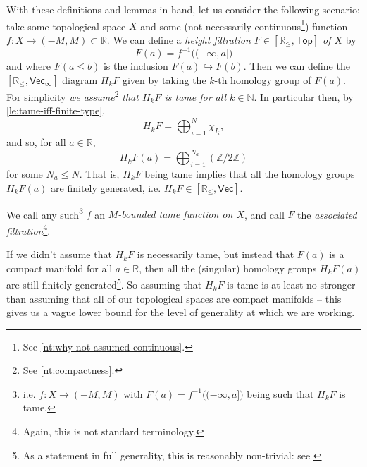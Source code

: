 \documentclass[12pt]{article}
\numberwithin{equation}{subsection}
\numberwithin{theorem}{subsection}
\numberwithin{lemma}{subsection}
\numberwithin{corollary}{subsection}
\numberwithin{definition}{subsection}
\numberwithin{example}{subsection}
\numberwithin{note}{subsection}
\newcommand{\zz}{\mathbb{Z}}
\newcommand{\rr}{\mathbb{R}}
\newcommand{\nn}{\mathbb{N}}
\newcommand{\rrleq}{\rr_\leqslant}
\newcommand{\Vecrrdiag}{[\rr_\leqslant,\mathsf{Vec}]}
\newcommand{\Top}{\mathsf{Top}}
\begin{document}
            With these definitions and lemmas in hand, let us consider the following scenario: take some topological space $X$ and some (not necessarily continuous\footnote{
                See \cref{nt:why-not-assumed-continuous}.
            }) function $f\colon X\to(-M,M)\subset\rr$.
            We can define a \emph{height filtration $F\in[\rrleq,\Top]$ of $X$} by
            \begin{equation*}
                F(a)=f^{-1}\big((-\infty,a]\big)
            \end{equation*}
            and where $F(a\leqslant b)$ is the inclusion $F(a)\hookrightarrow F(b)$.
            Then we can define the $[\rrleq,\mathsf{Vec}_\infty]$ diagram $H_kF$ given by taking the $k$-th homology group of $F(a)$.
            For simplicity \emph{we assume}\footnote{
                See \cref{nt:compactness}.
            } \emph{that $H_kF$ is tame for all $k\in\nn$}.
            In particular then, by \cref{le:tame-iff-finite-type},
            \begin{equation}
                H_kF=\bigoplus_{i=1}^N\chi_{I_i},
            \end{equation}
            and so, for all $a\in\rr$,
            \begin{equation}
                H_kF(a)=\bigoplus_{i=1}^{N_a}(\zz/2\zz)
            \end{equation}
            for some $N_a\leqslant N$.
            That is, $H_kF$ being tame implies that all the homology groups $H_kF(a)$ are finitely generated, i.e. $H_kF\in\Vecrrdiag$.

            \begin{definition}
                We call any such\footnote{
                    i.e. $f\colon X\to(-M,M)$ with $F(a)=f^{-1}\big((-\infty,a]\big)$ being such that $H_kF$ is tame.
                } $f$ an \emph{$M$-bounded tame function on $X$}, and call $F$ the \emph{associated filtration}\footnote{
                    Again, this is not standard terminology.
                }.
            \end{definition}

            \begin{note}\label{nt:compactness}
                If we didn't assume that $H_kF$ is necessarily tame, but instead that $F(a)$ is a compact manifold for all $a\in\rr$, then all the (singular) homology groups $H_kF(a)$ are still finitely generated\footnote{
                    As a statement in full generality, this is reasonably non-trivial: see \cite[Proposition~III.1,~p.~130]{Neeb:2004te}
                }.
                So assuming that $H_kF$ is tame is at least no stronger than assuming that all of our topological spaces are compact manifolds -- this gives us a vague lower bound for the level of generality at which we are working.
            \end{note}
\end{document}
